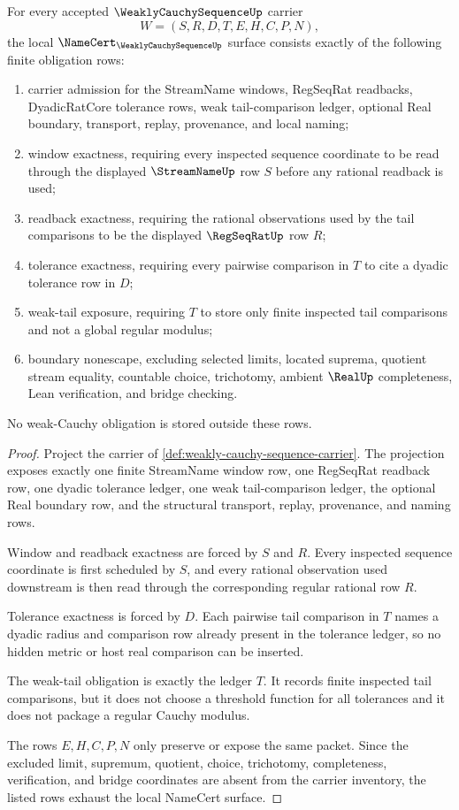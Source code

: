 \begin{theorem}
\label{thm:weakly-cauchy-sequence-namecert-obligations}
For every accepted $\WeaklyCauchySequenceUp$ carrier
$$
W=(S,R,D,T,E,H,C,P,N),
$$
the local $\NameCert_{\WeaklyCauchySequenceUp}$ surface consists exactly of the following finite obligation rows:
\begin{enumerate}
\item carrier admission for the StreamName windows, RegSeqRat readbacks, DyadicRatCore tolerance rows, weak tail-comparison ledger, optional Real boundary, transport, replay, provenance, and local naming;
\item window exactness, requiring every inspected sequence coordinate to be read through the displayed $\StreamNameUp$ row $S$ before any rational readback is used;
\item readback exactness, requiring the rational observations used by the tail comparisons to be the displayed $\RegSeqRatUp$ row $R$;
\item tolerance exactness, requiring every pairwise comparison in $T$ to cite a dyadic tolerance row in $D$;
\item weak-tail exposure, requiring $T$ to store only finite inspected tail comparisons and not a global regular modulus;
\item boundary nonescape, excluding selected limits, located suprema, quotient stream equality, countable choice, trichotomy, ambient $\RealUp$ completeness, Lean verification, and bridge checking.
\end{enumerate}
No weak-Cauchy obligation is stored outside these rows.
\end{theorem}
\begin{proof}
Project the carrier of \autoref{def:weakly-cauchy-sequence-carrier}. The projection exposes exactly one finite StreamName window row, one RegSeqRat readback row, one dyadic tolerance ledger, one weak tail-comparison ledger, the optional Real boundary row, and the structural transport, replay, provenance, and naming rows.

Window and readback exactness are forced by $S$ and $R$. Every inspected sequence coordinate is first scheduled by $S$, and every rational observation used downstream is then read through the corresponding regular rational row $R$.

Tolerance exactness is forced by $D$. Each pairwise tail comparison in $T$ names a dyadic radius and comparison row already present in the tolerance ledger, so no hidden metric or host real comparison can be inserted.

The weak-tail obligation is exactly the ledger $T$. It records finite inspected tail comparisons, but it does not choose a threshold function for all tolerances and it does not package a regular Cauchy modulus.

The rows $E,H,C,P,N$ only preserve or expose the same packet. Since the excluded limit, supremum, quotient, choice, trichotomy, completeness, verification, and bridge coordinates are absent from the carrier inventory, the listed rows exhaust the local NameCert surface.
\end{proof}

